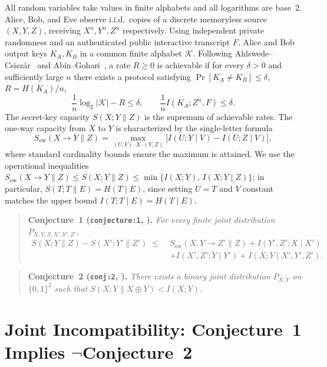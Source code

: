 \documentclass[11pt]{article}
\theoremstyle{plain}
\theoremstyle{definition}
\theoremstyle{remark}
\newcommand{\Sow}{S_{\mathrm{ow}}}
\newcommand{\mkv}{\text{--}}
\begin{document}
All random variables take values in finite alphabets and all logarithms are base~$2$.
Alice, Bob, and Eve observe i.i.d.\ copies of a discrete memoryless source $(X, Y, Z)$, receiving $X^n, Y^n, Z^n$ respectively.
Using independent private randomness and an authenticated public interactive transcript $F$, Alice and Bob output keys $K_A, K_B$ in a common finite alphabet $\mathcal{K}$.
Following Ahlswede--Csisz\'ar~\cite{AhlswedeCsiszar1993} and Abin--Gohari~\cite{AbinGohari2026}, a rate $R \ge 0$ is achievable if for every $\delta > 0$ and sufficiently large $n$ there exists a protocol satisfying $\Pr[K_A \neq K_B] \le \delta$, $R = H(K_A)/n$,
\[
\frac{1}{n}\log_2 |\mathcal{K}| - R \le \delta, \qquad \frac{1}{n}I(K_A; Z^n, F) \le \delta.
\]
The secret-key capacity $S(X; Y \| Z)$ is the supremum of achievable rates.
The one-way capacity from $X$ to $Y$ is characterized by the single-letter formula~\cite{AhlswedeCsiszar1993,AbinGohari2026}
\[
\Sow(X \to Y \| Z) = \max_{(U, V) \mkv X \mkv (Y, Z)} \bigl[I(U; Y \mid V) - I(U; Z \mid V)\bigr],
\]
where standard cardinality bounds ensure the maximum is attained.
We use the operational inequalities $\Sow(X \to Y \| Z) \le S(X; Y \| Z) \le \min\{I(X; Y),\, I(X; Y \mid Z)\}$; in particular, $S(T; T \| E) = H(T \mid E)$, since setting $U = T$ and $V$ constant matches the upper bound $I(T; T \mid E) = H(T \mid E)$.

\begin{quote}
\textbf{Conjecture~1 (\texttt{conjecture:1}, \cite{AbinGohari2026}).}
\emph{For every finite joint distribution $P_{X, Y, Z, X', Y', Z'}$,}
\begin{equation}\label{eq:conj1}
\begin{split}
S(X; Y \| Z) - S(X'; Y' \| Z') \;\le\;{}& \Sow(X, Y \to Z' \| Z) + I(Y', Z'; X \mid X') \\
&+ I(X', Z'; Y \mid Y') + I(X; Y \mid X', Y', Z').
\end{split}
\end{equation}
\end{quote}

\begin{quote}
\textbf{Conjecture~2 (\texttt{conj:2}, \cite{AbinGohari2026}).}
\emph{There exists a binary joint distribution $P_{X, Y}$ on $\{0, 1\}^2$ such that $S(X; Y \| X \oplus Y) < I(X; Y)$.}
\end{quote}

\section{Joint Incompatibility: Conjecture~1 Implies \texorpdfstring{$\neg$}{not }Conjecture~2}
\end{document}
